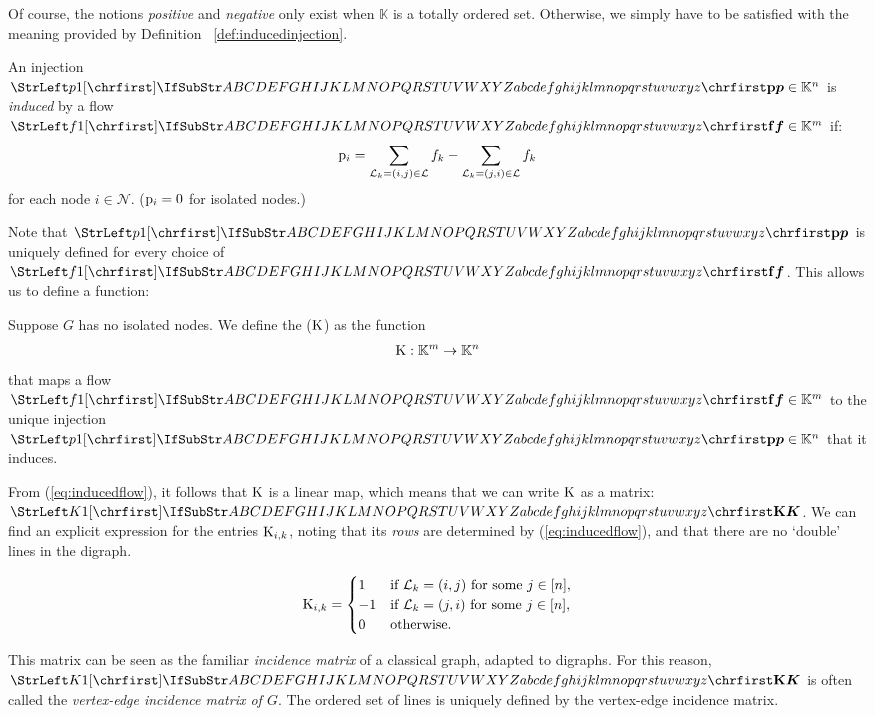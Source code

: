 \documentclass[main.tex]{subfiles}
\begin{document}
Of course, the notions \emph{positive} and \emph{negative} only exist when $\mathbb{K}$ is a totally ordered set. Otherwise, we simply have to be satisfied with the meaning provided by Definition~ \ref{def:inducedinjection}.


\begin{definition}\label{def:inducedinjection}
An injection $\mat{p} \in \mathbb{K}^n$ is \emph{induced} by a flow $\mat{f} \in \mathbb{K}^m$ if:
\begin{gather}
    {\mathrm{p}}_i =
    \sum_{\mathcal{L}_k=(i,j) \in \mathcal{L}} f_k -
    \sum_{\mathcal{L}_k=(j,i) \in \mathcal{L}} f_k \label{eq:inducedflow}
\end{gather}
for each node $i \in \mathcal{N}$. (${\mathrm{p}}_i = 0$ for isolated nodes.)
\end{definition}
Note that $\mat{p}$ is uniquely defined for every choice of $\mat{f}$. This allows us to define a function:
\begin{definition}
Suppose $G$ has no isolated nodes. We define the  ($\text{\textup{K}}$) as the function
\begin{gather*}
    \text{\textup{K}}: \mathbb{K}^m \rightarrow \mathbb{K}^n
\end{gather*}
that maps a flow $\mat{f} \in \mathbb{K}^m$ to the unique injection $\mat{p} \in \mathbb{K}^n$ that it induces.
\end{definition}

From (\ref{eq:inducedflow}), it follows that $\text{\textup{K}}$ is a linear map, which means that we can write $\text{\textup{K}}$ as a matrix: $\mat{K}$. We can find an explicit expression for the entries ${\mathrm{K}}_{i,k}$, noting that its \emph{rows} are determined by (\ref{eq:inducedflow}), and that there are no `double' lines in the digraph.

\begin{align*}
    {\mathrm{K}}_{i,k} =
    \begin{cases}
         1 & \text{if } \mathcal{L}_k=(i,j) \text{ for some } j \in [n], \\
        -1 & \text{if } \mathcal{L}_k=(j,i) \text{ for some } j \in [n], \\
         0 & \text{otherwise}.
    \end{cases}
\end{align*}

This matrix can be seen as the familiar \emph{incidence matrix} of a classical graph, adapted to digraphs. For this reason, $\mat{K}$ is often called the \emph{vertex-edge incidence matrix of $G$}.
The ordered set of lines is uniquely defined by the vertex-edge incidence matrix. 
\end{document}
